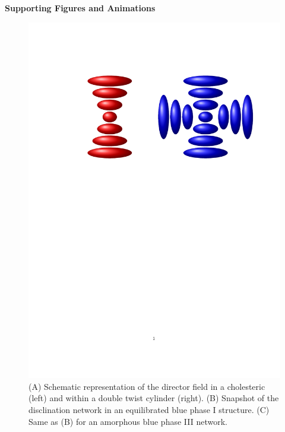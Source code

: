 \documentclass[12pt,twoside]{article}
\begin{document}
\vfill\pagebreak


{\bf Supporting Figures and Animations}

\begin{figure}[h]
\begin{center}
\includegraphics[scale=0.8]{doubletwist.pdf}
\end{center}
\caption{
(A) Schematic representation of the director field
in a cholesteric (left) and within a double twist cylinder (right).
(B) Snapshot of the disclination network in an equilibrated 
blue phase I structure. (C) Same as (B) for an amorphous blue phase III
network.}
\end{figure}

\vfill\pagebreak
\end{document}
